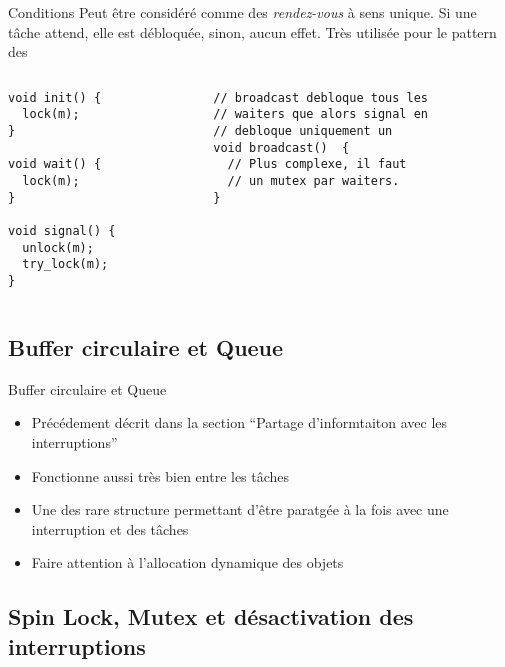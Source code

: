\begin{frame}[fragile]{Conditions}
  Peut être  considéré comme des \emph{rendez-vous} à  sens unique. Si
  une  tâche attend,  elle  est débloquée,  sinon,  aucun effet.  Très
  utilisée pour le pattern des 
  \begin{columns}
    \begin{column}{5cm}
      \begin{lstlisting} 
void init() {
  lock(m);
}

void wait() {
  lock(m);
}

void signal() {
  unlock(m);
  try_lock(m);
}
      \end{lstlisting}
    \end{column}
    \begin{column}{5cm}
      \begin{lstlisting} 
// broadcast debloque tous les 
// waiters que alors signal en 
// debloque uniquement un
void broadcast()  {
  // Plus complexe, il faut 
  // un mutex par waiters. 
}
      \end{lstlisting} 
    \end{column}
  \end{columns}
\end{frame} 

\subsection{Buffer circulaire et Queue}

\begin{frame}[fragile]{Buffer circulaire et Queue}
  \begin{itemize} 
  \item  Précédement décrit dans  la section  ``Partage d'informtaiton
    avec les interruptions''
  \item Fonctionne aussi très bien entre les tâches
  \item Une  des rare structure  permettant d'être paratgée à  la fois
    avec une interruption et des tâches
  \item Faire attention à l'allocation dynamique des objets
  \end{itemize}
\end{frame} 

\subsection{Spin Lock, Mutex et désactivation des interruptions}

